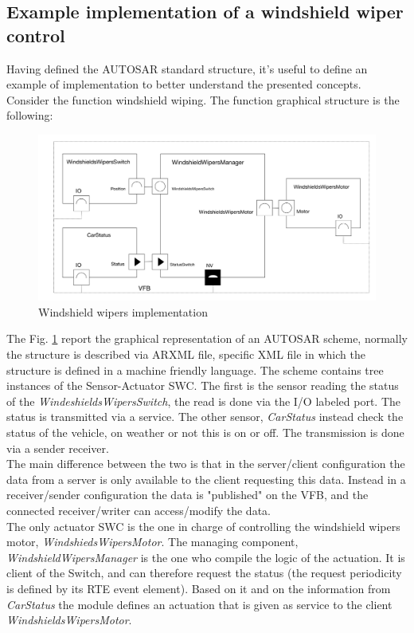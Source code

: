 \documentclass[../main.tex]{subfiles}
\begin{document}
\subsection{Example implementation of a windshield wiper control}
Having defined the \gls{AUTOSAR} standard structure, it's useful to define an example of implementation to better understand the presented concepts. Consider the function windshield wiping. The function graphical structure is the following:
\begin{figure}[H]
    \centering
    \includegraphics[width=\linewidth]{images_folder/windshield_WIpers_aUtosar.jpeg}
    \caption{Windshield wipers implementation}
    \label{fig:WINWIP}
\end{figure}
The Fig. \ref{fig:WINWIP} report the graphical representation of an \gls{AUTOSAR} scheme, normally the structure is described via ARXML file, specific XML file in which the structure is defined in a machine friendly language. 
The scheme contains tree instances of the Sensor-Actuator \gls{SWC}. The first is the sensor reading the status of the \textit{WindeshieldsWipersSwitch}, the read is done via the \gls{I/O} labeled port. The status is transmitted via a service. The other sensor, \textit{CarStatus} instead check the status of the vehicle, on weather or not this is on or off. The transmission is done via a sender receiver.\\
The main difference between the two is that in the server/client configuration the data from a server is only available to the client requesting this data. Instead in a receiver/sender configuration the data is "published" on the \gls{VFB}, and the connected receiver/writer can access/modify the data.\\
The only actuator \gls{SWC} is the one in charge of controlling the windshield wipers motor, \textit{WindshiedsWipersMotor}. The managing component, \textit{WindshieldWipersManager} is the one who compile the logic of the actuation. It is client of the Switch, and can therefore request the status (the request periodicity is defined by its RTE event element). Based on it and on the information from \textit{CarStatus} the module defines an actuation that is given as service to the client \textit{WindshieldsWipersMotor}.\\
\end{document}
